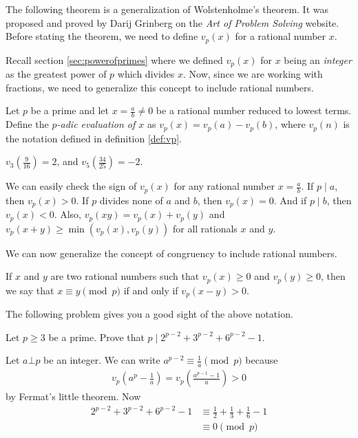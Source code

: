 \documentclass{subfile}
\begin{document}
	The following theorem is a generalization of Wolstenholme's theorem. It was proposed and proved by Darij Grinberg on the \textit{Art of Problem Solving} website. Before stating the theorem, we need to define $v_p(x)$ for a rational number $x$.

	Recall section \eqref{sec:powerofprimes} where we defined $v_p(x)$ for $x$ being an \textit{integer} as the greatest power of $p$ which divides $x$. Now, since we are working with fractions, we need to generalize this concept to include rational numbers.

	\begin{definition}
		Let $p$ be a prime and let $x = \frac{a}{b} \neq 0$ be a rational number reduced to lowest terms. Define the \textit{$p$-adic evaluation of $x$} as $v_p(x) = v_p(a)-v_p(b)$, where $v_p(n)$ is the notation defined in definition \eqref{def:vp}.
	\end{definition}

	\begin{example}
		$v_3\left(\frac{9}{16}\right) = 2$, and $v_5\left(\frac{34}{25}\right) = -2$.
	\end{example}

	\begin{note}
		We can easily check the sign of $v_p(x)$ for any rational number $x=\frac{a}{b}$. If $p\mid a$, then $v_p(x)>0$. If $p$ divides none of $a$ and $b$, then $v_p(x)=0$. And if $p\mid b$, then $v_p(x)<0$. Also,  $ v_{p}\left(xy\right) = v_{p}\left(x\right) + v_{p}\left(y\right)$ and $ v_{p}\left(x + y\right)\geq\min\left(v_{p}\left(x\right),v_{p}\left(y\right)\right)$ for all rationals $x$ and $y$.
	\end{note}

	We can now generalize the concept of congruency to include rational numbers.
	\begin{definition}
		If $x$ and $y$ are two rational numbers such that $ v_{p}\left(x\right)\geq 0$ and $ v_{p}\left(y\right)\geq 0$, then we say that $ x\equiv y\pmod p$ if and only if $ v_{p}\left(x - y\right) > 0$.
	\end{definition}

	The following problem gives you a good sight of the above notation.

	\begin{problem}
		Let $p \geq 3$ be a prime. Prove that $p\mid 2^{p-2}+3^{p-2}+6^{p-2}-1$.
	\end{problem}

	\begin{solution}
		Let $a \bot p$ be an integer. We can write $a^{p-2} \equiv \frac{1}{a} \pmod p$ because
			\begin{align*}
				v_p\left(a^p - \frac{1}{a}\right)=v_p\left(\frac{a^{p-1}-1}{a}\right)>0
			\end{align*}
		by Fermat's little theorem. Now
		\begin{align*}
		2^{p-2}+3^{p-2}+6^{p-2}-1
			& \equiv \frac{1}{2}+\frac{1}{3}+\frac{1}{6}-1\\
			& \equiv 0 \pmod p
		\end{align*}
	\end{solution}
\end{document}
